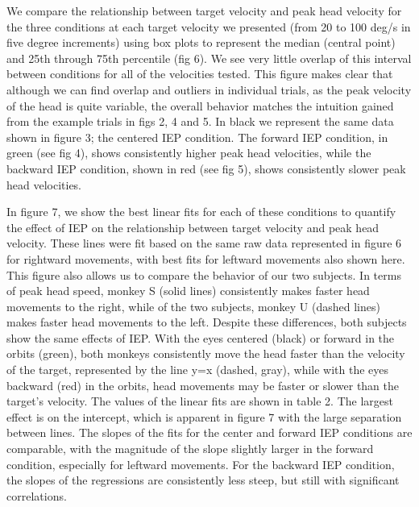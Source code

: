 \documentclass[12pt]{article}
\begin{document}
We compare the relationship between target velocity and peak head velocity for the three conditions at each target velocity we presented (from 20 to 100 deg/s in five degree increments) using box plots to represent the median (central point) and 25th through 75th percentile (fig 6). We see very little overlap of this interval between conditions for all of the velocities tested. This figure makes clear that although we can find overlap and outliers in individual trials, as the peak velocity of the head is quite variable, the overall behavior matches the intuition gained from the example trials in figs 2, 4 and 5. In black we represent the same data shown in figure 3; the centered IEP condition. The forward IEP condition, in green (see fig 4), shows consistently higher peak head velocities, while the backward IEP condition, shown in red (see fig 5), shows consistently slower peak head velocities. 

In figure 7, we show the best linear fits for each of these conditions to quantify the effect of IEP on the relationship between target velocity and peak head velocity. These lines were fit based on the same raw data represented in figure 6 for rightward movements, with best fits for leftward movements also shown here. This figure also allows us to compare the behavior of our two subjects. In terms of peak head speed, monkey S (solid lines) consistently makes faster head movements to the right, while of the two subjects, monkey U (dashed lines) makes faster head movements to the left. Despite these differences, both subjects show the same effects of IEP. With the eyes centered (black) or forward in the orbits (green), both monkeys consistently move the head faster than the velocity of the target, represented by the line y=x (dashed, gray), while with the eyes backward (red) in the orbits, head movements may be faster or slower than the target’s velocity. The values of the linear fits are shown in table 2. The largest effect is on the intercept, which is apparent in figure 7 with the large separation between lines. The slopes of the fits for the center and forward IEP conditions are comparable, with the magnitude of the slope slightly larger in the forward condition, especially for leftward movements. For the backward IEP condition, the slopes of the regressions are consistently less steep, but still with significant correlations.
\end{document}
